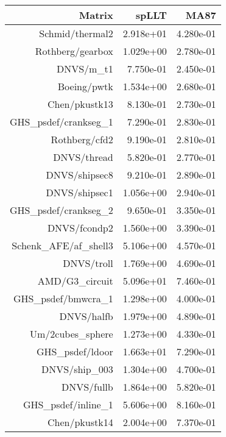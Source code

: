 \begin{tabular}{r|rr}
  Matrix & spLLT      & MA87 \\
  \hline
  Schmid/thermal2                     &    2.918e+01 &    4.280e-01 \\
  Rothberg/gearbox                    &    1.029e+00 &    2.780e-01 \\
  DNVS/m\_t1                          &    7.750e-01 &    2.450e-01 \\
  Boeing/pwtk                         &    1.534e+00 &    2.680e-01 \\
  Chen/pkustk13                       &    8.130e-01 &    2.730e-01 \\
  GHS\_psdef/crankseg\_1              &    7.290e-01 &    2.830e-01 \\
  Rothberg/cfd2                       &    9.190e-01 &    2.810e-01 \\
  DNVS/thread                         &    5.820e-01 &    2.770e-01 \\
  DNVS/shipsec8                       &    9.210e-01 &    2.890e-01 \\
  DNVS/shipsec1                       &    1.056e+00 &    2.940e-01 \\
  GHS\_psdef/crankseg\_2              &    9.650e-01 &    3.350e-01 \\
  DNVS/fcondp2                        &    1.560e+00 &    3.390e-01 \\
  Schenk\_AFE/af\_shell3              &    5.106e+00 &    4.570e-01 \\
  DNVS/troll                          &    1.769e+00 &    4.690e-01 \\
  AMD/G3\_circuit                     &    5.096e+01 &    7.460e-01 \\
  GHS\_psdef/bmwcra\_1                &    1.298e+00 &    4.000e-01 \\
  DNVS/halfb                          &    1.979e+00 &    4.890e-01 \\
  Um/2cubes\_sphere                   &    1.273e+00 &    4.330e-01 \\
  GHS\_psdef/ldoor                    &    1.663e+01 &    7.290e-01 \\
  DNVS/ship\_003                      &    1.304e+00 &    4.700e-01 \\
  DNVS/fullb                          &    1.864e+00 &    5.820e-01 \\
  GHS\_psdef/inline\_1                &    5.606e+00 &    8.160e-01 \\
  Chen/pkustk14                       &    2.004e+00 &    7.370e-01 \\

\end{tabular}

